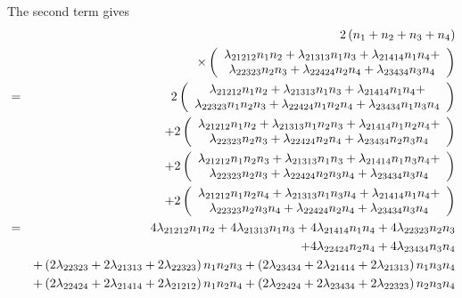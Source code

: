 \documentclass[12pt]{article}
\begin{document}
The second term gives%
\begin{eqnarray}
&&2\left( n_{1}+n_{2}+n_{3}+n_{4}\right)  \notag \\
&&\times \left( 
\begin{array}{c}
\lambda _{21212}n_{1}n_{2}+\lambda _{21313}n_{1}n_{3}+\lambda
_{21414}n_{1}n_{4}+ \\ 
\lambda _{22323}n_{2}n_{3}+\lambda _{22424}n_{2}n_{4}+\lambda
_{23434}n_{3}n_{4}%
\end{array}%
\right)  \notag \\
&=&2\left( 
\begin{array}{c}
\lambda _{21212}n_{1}n_{2}+\lambda _{21313}n_{1}n_{3}+\lambda
_{21414}n_{1}n_{4}+ \\ 
\lambda _{22323}n_{1}n_{2}n_{3}+\lambda _{22424}n_{1}n_{2}n_{4}+\lambda
_{23434}n_{1}n_{3}n_{4}%
\end{array}%
\right)  \notag \\
&&+2\left( 
\begin{array}{c}
\lambda _{21212}n_{1}n_{2}+\lambda _{21313}n_{1}n_{2}n_{3}+\lambda
_{21414}n_{1}n_{2}n_{4}+ \\ 
\lambda _{22323}n_{2}n_{3}+\lambda _{22424}n_{2}n_{4}+\lambda
_{23434}n_{2}n_{3}n_{4}%
\end{array}%
\right)  \notag \\
&&+2\left( 
\begin{array}{c}
\lambda _{21212}n_{1}n_{2}n_{3}+\lambda _{21313}n_{1}n_{3}+\lambda
_{21414}n_{1}n_{3}n_{4}+ \\ 
\lambda _{22323}n_{2}n_{3}+\lambda _{22424}n_{2}n_{3}n_{4}+\lambda
_{23434}n_{3}n_{4}%
\end{array}%
\right)  \notag \\
&&+2\left( 
\begin{array}{c}
\lambda _{21212}n_{1}n_{2}n_{4}+\lambda _{21313}n_{1}n_{3}n_{4}+\lambda
_{21414}n_{1}n_{4}+ \\ 
\lambda _{22323}n_{2}n_{3}n_{4}+\lambda _{22424}n_{2}n_{4}+\lambda
_{23434}n_{3}n_{4}%
\end{array}%
\right)  \notag \\
&=&4\lambda _{21212}n_{1}n_{2}+4\lambda _{21313}n_{1}n_{3}+4\lambda
_{21414}n_{1}n_{4}+4\lambda _{22323}n_{2}n_{3}  \notag \\
&&+4\lambda _{22424}n_{2}n_{4}+4\lambda _{23434}n_{3}n_{4}  \notag \\
&&+\left( 2\lambda _{22323}+2\lambda _{21313}+2\lambda _{22323}\right)
n_{1}n_{2}n_{3}+\left( 2\lambda _{23434}+2\lambda _{21414}+2\lambda
_{21313}\right) n_{1}n_{3}n_{4}  \notag \\
&&+\left( 2\lambda _{22424}+2\lambda _{21414}+2\lambda _{21212}\right)
n_{1}n_{2}n_{4}+\left( 2\lambda _{22424}+2\lambda _{23434}+2\lambda
_{22323}\right) n_{2}n_{3}n_{4}
\end{eqnarray}
\end{document}
